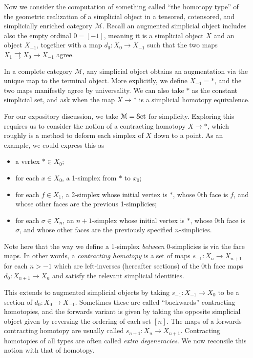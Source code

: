  Now we consider the computation of something called ``the homotopy type'' of the geometric realization of a simplicial object in a tensored, cotensored, and simplicially enriched category $\mathcal{M} $. Recall an augmented simplicial object includes also the empty ordinal $0=[-1]$, meaning it is a simplicial object $X$ and an object $X_{-1} $, together with a map $d_0: X_0 \to X_{-1} $ such that the two maps $X_1\rightrightarrows X_0\to X_{-1} $ agree.

In a complete category $\mathcal{M} $, any simplicial object obtains an augmentation via the unique map to the terminal object. More explicitly, we define $X_{-1} =*$, and the two maps manifestly agree by universality. We can also take $*$ as the constant simplicial set, and ask when the map $X\to *$ is a simplicial homotopy equivalence.

For our expository discussion, we take $\mathcal{M} =\mathcal{S}\mathrm{et} $ for simplicity. Exploring this requires us to consider the notion of a contracting homotopy $X\to *$, which roughly is a method to deform each simplex of $X$ down to a point. As an example, we could express this as
\begin{itemize}
	\item a vertex $*\in X_0$;
	\item for each $x\in X_0$, a 1-simplex from $*$ to $x_0$;
	\item for each $f\in X_1$, a 2-simplex whose initial vertex is $*$, whose 0th face is $f$, and whose other faces are the previous 1-simplicies;
	\item for each $\sigma\in X_n$, an $n+1$-simplex whose initial vertex is $*$, whose 0th face is $\sigma$, and whose other faces are the previously specified $n$-simplicies.
\end{itemize}
Note here that the way we define a 1-simplex \emph{between} 0-simplicies is via the face maps. In other words, a \emph{contracting homotopy} is a set of maps $s_{-1} : X_n \to X_{n+1} $ for each $n>-1$ which are left-inverses (hereafter sections) of the 0th face maps $d_0: X_{n+1}  \to X_{n} $ and satisfy the relevant simplicial identities.

This extends to augmented simplicial objects by taking $s_{-1} : X_{-1}  \to X_0$ to be a section of $d_0: X_0 \to X_{-1} $. Sometimes these are called ``backwards'' contracting homotopies, and the forwards variant is given by taking the opposite simplicial object given by reversing the ordering of each set $[n]$. The maps of a forwards contracting homotopy are usually called $s_{n+1} : X_n \to X_{n+1} $. Contracting homotopies of all types are often called \emph{extra degeneracies}. We now reconsile this notion with that of homotopy.

